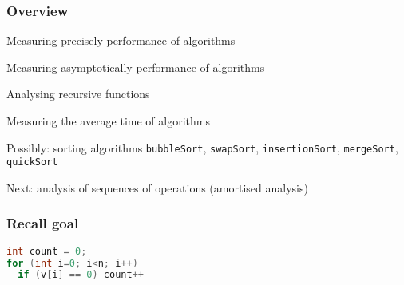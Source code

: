 \documentclass[aspectratio=169]{beamer}
\begin{document}
\frame[plain]{\titlepage}


\begin{frame}[t]\frametitle{Overview}


  \begin{itemize}
    {\color{black!25}
    \item Measuring {precisely} performance of algorithms
    \item Measuring {asymptotically} performance of algorithms
    \item Analysing {recursive} functions}
    \item Measuring  the \alert{average time} of algorithms
    {\color{black!25}
    \item Possibly: sorting algorithms \texttt{bubbleSort}, \texttt{swapSort}, \texttt{insertionSort}, \texttt{mergeSort}, \texttt{quickSort}}
    \item Next: analysis of sequences of operations (\alert{amortised analysis})
  \end{itemize}
\end{frame}


\begin{frame}[fragile]\frametitle{Recall goal}

\begin{lstlisting}[language=C++,linewidth=50mm]
int count = 0;
for (int i=0; i<n; i++)
  if (v[i] == 0) count++
\end{lstlisting}    

\end{frame}
\end{document}
